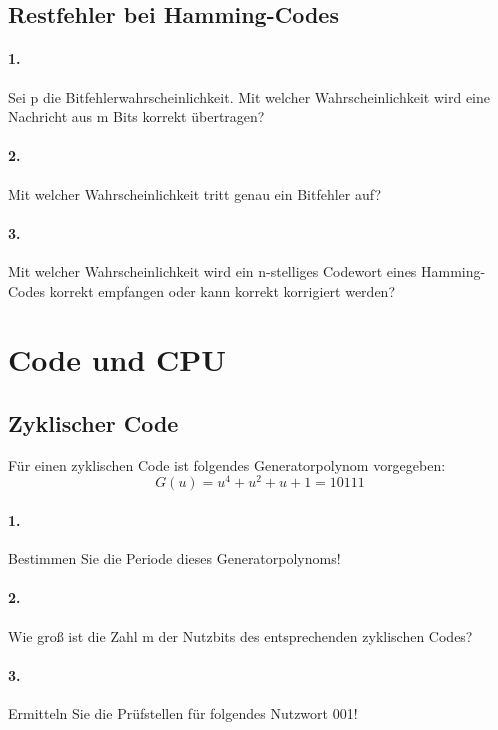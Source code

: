 \documentclass[paper=a4, fontsize=11pt]{scrartcl}
\numberwithin{equation}{section}
\numberwithin{figure}{section}
\numberwithin{table}{section}
\begin{document}
\subsection{Restfehler bei Hamming-Codes}
\paragraph{1.}
Sei p die Bitfehlerwahrscheinlichkeit. Mit welcher Wahrscheinlichkeit wird eine Nachricht aus m Bits korrekt übertragen?

\paragraph{2.}
Mit welcher Wahrscheinlichkeit tritt genau ein Bitfehler auf?

\paragraph{3.}
Mit welcher Wahrscheinlichkeit wird ein n-stelliges Codewort eines Hamming-Codes korrekt empfangen oder kann korrekt korrigiert werden?

\section{Code und CPU}
\subsection{Zyklischer Code}
Für einen zyklischen Code ist folgendes Generatorpolynom vorgegeben:
$$G(u)=u^{4}+u^{2}+u+1=10111$$

\paragraph{1.}
Bestimmen Sie die Periode dieses Generatorpolynoms!

\paragraph{2.}
Wie groß ist die Zahl m der Nutzbits des entsprechenden zyklischen Codes?

\paragraph{3.}
Ermitteln Sie die Prüfstellen für folgendes Nutzwort 001!
\end{document}
